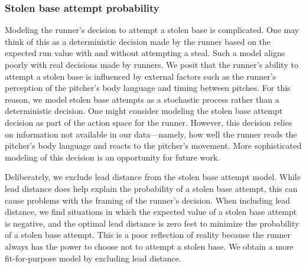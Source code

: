 \documentclass[opre,dblanonrev]{informs4}
\begin{document}
      \subsubsection{Stolen base attempt probability}
      \label{sec:prob-sb-attempt}

        Modeling the runner's decision to attempt a stolen base is complicated. One may think of this as a deterministic decision made by the runner based on the expected run value with and without attempting a steal. Such a model aligns poorly with real decisions made by runners. We posit that the runner's ability to attempt a stolen base is influenced by external factors such as the runner's perception of the pitcher's body language and timing between pitches. For this reason, we model stolen base attempts as a stochastic process rather than a deterministic decision. One might consider modeling the stolen base attempt decision as part of the action space for the runner. However, this decision relies on information not available in our data---namely, how well the runner reads the pitcher's body language and reacts to the pitcher's movement. More sophisticated modeling of this decision is an opportunity for future work.

        Deliberately, we exclude lead distance from the stolen base attempt model. While lead distance does help explain the probability of a stolen base attempt, this can cause problems with the framing of the runner's decision. When including lead distance, we find situations in which the expected value of a stolen base attempt is negative, and the optimal lead distance is zero feet to minimize the probability of a stolen base attempt. This is a poor reflection of reality because the runner always has the power to choose not to attempt a stolen base. We obtain a more fit-for-purpose model by excluding lead distance.
\end{document}
